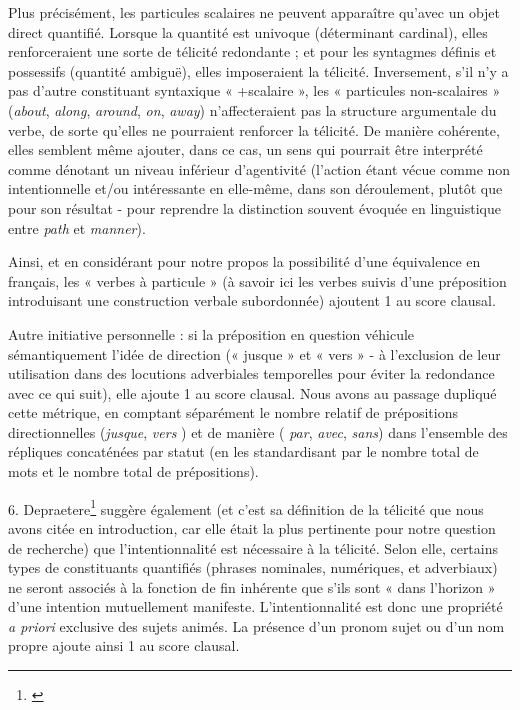 Plus précisément, les particules scalaires ne peuvent apparaître qu'avec un objet direct quantifié. Lorsque la quantité est univoque (déterminant cardinal), elles renforceraient une sorte de télicité redondante ; et pour les syntagmes définis et possessifs (quantité ambiguë), elles imposeraient la télicité. Inversement, s'il n'y a pas d'autre constituant syntaxique « +scalaire », les « particules non-scalaires » (\textit{about}, \textit{along}, \textit{around}, \textit{on}, \textit{away}) n'affecteraient pas la structure argumentale du verbe, de sorte qu'elles ne pourraient renforcer la télicité. De manière cohérente, elles semblent même ajouter, dans ce cas, un sens qui pourrait être interprété comme dénotant un niveau inférieur d’agentivité (l'action étant vécue comme non intentionnelle et/ou intéressante en elle-même, dans son déroulement, plutôt que pour son résultat - pour reprendre la distinction souvent évoquée en linguistique entre \textit{path} et \textit{manner}).

Ainsi, et en considérant pour notre propos la possibilité d'une équivalence en français, les « verbes à particule » (à savoir ici les verbes suivis d'une préposition introduisant une construction verbale subordonnée) ajoutent 1 au score clausal. 

Autre initiative personnelle : si la préposition en question véhicule sémantiquement l'idée de direction (« jusque » et « vers » - à l'exclusion de leur utilisation dans des locutions adverbiales temporelles pour éviter la redondance avec ce qui suit), elle ajoute 1 au score clausal. Nous avons au passage dupliqué cette métrique, en comptant séparément le nombre relatif de prépositions directionnelles (\textit{jusque}, \textit{vers} ) et de manière ( \textit{par}, \textit{avec}, \textit{sans}) dans l'ensemble des répliques concaténées par statut (en les standardisant par le nombre total de mots et le nombre total de prépositions).

6. Depraetere\footnote{\cite{depraetere_telicity_2007}} suggère également (et c'est sa définition de la télicité que nous avons citée en introduction, car elle était la plus pertinente pour notre question de recherche) que l'intentionnalité est nécessaire à la télicité. Selon elle, certains types de constituants quantifiés (phrases nominales, numériques, et adverbiaux) ne seront associés à la fonction de fin inhérente que s'ils sont « dans l'horizon » d'une intention mutuellement manifeste. L'intentionnalité est donc une propriété \textit{a priori} exclusive des sujets animés. La présence d'un pronom sujet ou d'un nom propre ajoute ainsi 1 au score clausal.

